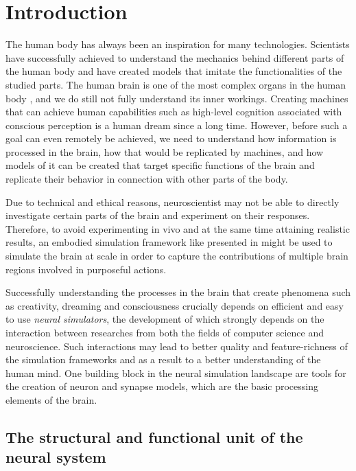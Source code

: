 \chapter{Introduction}


The human body has always been an inspiration for many technologies. Scientists have successfully achieved to understand the mechanics behind different parts of the human body and have created models that imitate the functionalities of the studied parts. The human brain is one of the most complex organs in the human body \citep{nolte2002human}, and we do still not fully understand its inner workings. Creating machines that can achieve human capabilities such as high-level cognition associated with conscious perception is a human dream since a long time. However, before such a goal can even remotely be achieved, we need to understand how information is processed in the brain, how that would be replicated by machines, and how models of it can be created that target specific functions of the brain and replicate their behavior in connection with other parts of the body.

Due to technical and ethical reasons, neuroscientist may not be able to directly investigate certain parts of the brain and experiment on their responses. Therefore, to avoid experimenting in vivo and at the same time attaining realistic results, an embodied simulation framework like presented in \citet{10.3389/fninf.2022.884180} might be used to simulate the brain at scale in order to capture the contributions of multiple brain regions involved in purposeful actions.

Successfully understanding the processes in the brain that create phenomena such as creativity, dreaming and consciousness crucially depends on efficient and easy to use \emph{neural simulators}, the development of which strongly depends on the interaction between researches from both the fields of computer science and neuroscience. Such interactions may lead to better quality and feature-richness of the simulation frameworks and as a result to a better understanding of the human mind. One building block in the neural simulation landscape are tools for the creation of neuron and synapse models, which are the basic processing elements of the brain. 


\section{The structural and functional unit of the neural system}

